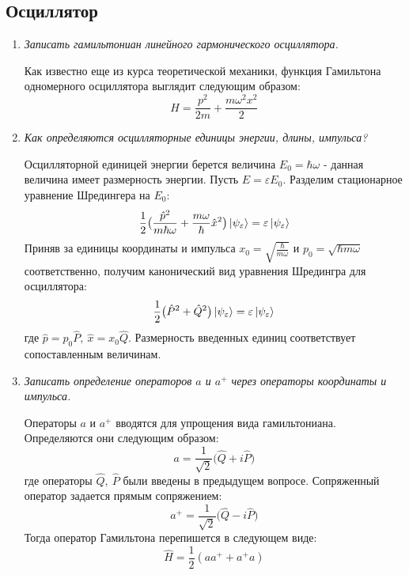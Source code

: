 \documentclass{article}
\begin{document}
\subsection*{Осциллятор}
\begin{enumerate}
	\item \textit{Записать гамильтониан линейного гармонического осциллятора.}
	
	Как известно еще из курса теоретической механики, функция Гамильтона одномерного осциллятора выглядит следующим образом:
	\begin{equation}
		H = \frac{p^2}{2m} + \frac{m\omega^2 x^2}{2}
	\end{equation}
	
	\item \textit{Как определяются осцилляторные единицы энергии, длины, импульса?}
	
	Осцилляторной единицей энергии берется величина $E_0 = \hbar\omega$ - данная величина имеет размерность энергии. Пусть $E = \varepsilon E_0$. Разделим стационарное уравнение Шредингера на $E_0$:
	\begin{equation}
		\frac{1}{2}\big( \frac{\hat{p}^2}{m\hbar\omega} + \frac{m\omega}{\hbar}\hat{x}^2 \big)\ket{\psi_\varepsilon} = \varepsilon \ket{\psi_\varepsilon}
	\end{equation}
	Приняв за единицы координаты и импульса $x_0 = \sqrt{\frac{\hbar}{m\omega}}$ и $p_0 = \sqrt{\hbar m \omega}$ соответственно, получим канонический вид уравнения Шредингра для осциллятора:
	\begin{equation}
		\frac{1}{2}\big( \hat{P}^2 + \hat{Q}^2\big) \ket{\psi_\varepsilon} = \varepsilon \ket{\psi_\varepsilon}
	\end{equation}
	где $\hat{p} = p_0 \hat{P}, \ \hat{x} = x_0 \hat{Q}$. Размерность введенных единиц соответствует сопоставленным величинам.
	
	\item \textit{Записать определение операторов $a$ и $a^+$ через операторы координаты и импульса.}
	
	Операторы $a$ и $a^+$ вводятся для упрощения вида гамильтониана. Определяются они следующим образом:
	\begin{equation}
		a = \frac{1}{\sqrt{2}}\big( \hat{Q} + i \hat{P} \big)
	\end{equation}
	где операторы $\hat{Q}, \ \hat{P}$ были введены в предыдущем вопросе. Сопряженный оператор задается прямым сопряжением:
	\begin{equation}
		a^+ = \frac{1}{\sqrt{2}}\big( \hat{Q} - i \hat{P} \big)
	\end{equation}
	Тогда оператор Гамильтона перепишется в следующем виде:
	\begin{equation}
		\hat{H} = \frac{1}{2}(aa^+ + a^+ a) \label{oscillatorFirst}
	\end{equation}
	

\end{enumerate}
\end{document}
